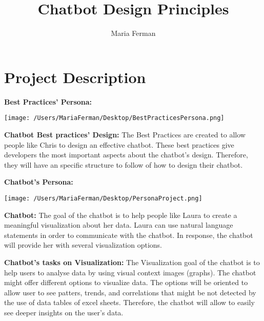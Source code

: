 \documentclass[a4paper,10pt]{article}
\title{Chatbot Design Principles}
\author{Maria Ferman}
\begin{document}
\maketitle

\section*{Project Description}

\textbf{Best Practices' Persona:}

\begin{center}
\texttt{[image: /Users/MariaFerman/Desktop/BestPracticesPersona.png]}
\end{center}


\textbf{Chatbot Best practices' Design:} The Best Practices are created to allow people like Chris to design an effective chatbot. These best practices give developers the most important aspects about the chatbot's design. Therefore, they will have an specific structure to follow of how to design  their chatbot.

\hfill \break

\textbf{Chatbot's Persona:}
\begin{center}
\texttt{[image: /Users/MariaFerman/Desktop/PersonaProject.png]}
\end{center}
\textbf{Chatbot:} The goal of the chatbot is to help people like Laura to create a meaningful visualization about her data. Laura can use natural language statements in order to communicate with the chatbot. In response, the chatbot will provide her with several visualization options.

\textbf{Chatbot's tasks on Visualization:} The Visualization goal of the chatbot is to help users to analyse data by using visual context images (graphs). The chatbot might offer different options to visualize data. The options will be oriented to allow user to see patters, trends, and correlations that might be not detected by the use of data tables of excel sheets. Therefore, the chatbot will allow to easily see deeper insights on the user's data.  

\medskip


\end{document}
